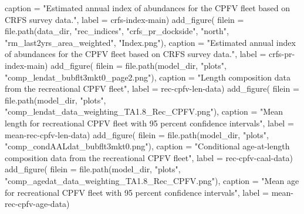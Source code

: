 \documentclass[
  letterpaper,
]{article}
\newenvironment{Shaded}{\begin{snugshade}}{\end{snugshade}}
\newcommand{\AttributeTok}[1]{\textcolor[rgb]{0.77,0.63,0.00}{#1}}
\newcommand{\FunctionTok}[1]{\textcolor[rgb]{0.00,0.00,0.00}{#1}}
\newcommand{\NormalTok}[1]{#1}
\newcommand{\StringTok}[1]{\textcolor[rgb]{0.31,0.60,0.02}{#1}}
\begin{document}
\begin{Shaded}
\begin{Highlighting}[]
\AttributeTok{caption =} \StringTok{"Estimated annual index of abundances for the CPFV fleet based on CRFS survey data."}\NormalTok{,}
\AttributeTok{label =} \StringTok{\textquotesingle{}crfs{-}index{-}main\textquotesingle{}}\NormalTok{)}
\FunctionTok{add\_figure}\NormalTok{(}
\AttributeTok{filein =} \FunctionTok{file.path}\NormalTok{(data\_dir, }\StringTok{"rec\_indices"}\NormalTok{, }\StringTok{"crfs\_pr\_dockside"}\NormalTok{, }\StringTok{"north"}\NormalTok{,  }\StringTok{"rm\_last2yrs\_area\_weighted"}\NormalTok{, }\StringTok{"Index.png"}\NormalTok{), }
\AttributeTok{caption =} \StringTok{"Estimated annual index of abundances for the CPFV fleet based on CRFS survey data."}\NormalTok{,}
\AttributeTok{label =} \StringTok{\textquotesingle{}crfs{-}pr{-}index{-}main\textquotesingle{}}\NormalTok{)}
\FunctionTok{add\_figure}\NormalTok{(}
\AttributeTok{filein =} \FunctionTok{file.path}\NormalTok{(model\_dir, }\StringTok{"plots"}\NormalTok{, }\StringTok{"comp\_lendat\_bubflt3mkt0\_page2.png"}\NormalTok{), }
\AttributeTok{caption =} \StringTok{"Length composition data from the recreational CPFV fleet"}\NormalTok{,}
\AttributeTok{label =} \StringTok{\textquotesingle{}rec{-}cpfv{-}len{-}data\textquotesingle{}}\NormalTok{)}
\FunctionTok{add\_figure}\NormalTok{(}
\AttributeTok{filein =} \FunctionTok{file.path}\NormalTok{(model\_dir, }\StringTok{"plots"}\NormalTok{, }\StringTok{"comp\_lendat\_data\_weighting\_TA1.8\_Rec\_CPFV.png"}\NormalTok{), }
\AttributeTok{caption =} \StringTok{"Mean length for recreational CPFV fleet with 95 percent confidence intervals"}\NormalTok{,}
\AttributeTok{label =} \StringTok{\textquotesingle{}mean{-}rec{-}cpfv{-}len{-}data\textquotesingle{}}\NormalTok{)}
\FunctionTok{add\_figure}\NormalTok{(}
\AttributeTok{filein =} \FunctionTok{file.path}\NormalTok{(model\_dir, }\StringTok{"plots"}\NormalTok{, }\StringTok{"comp\_condAALdat\_bubflt3mkt0.png"}\NormalTok{), }
\AttributeTok{caption =} \StringTok{"Conditional age{-}at{-}length composition data from the recreational CPFV fleet"}\NormalTok{,}
\AttributeTok{label =} \StringTok{\textquotesingle{}rec{-}cpfv{-}caal{-}data\textquotesingle{}}\NormalTok{)}
\FunctionTok{add\_figure}\NormalTok{(}
\AttributeTok{filein =} \FunctionTok{file.path}\NormalTok{(model\_dir, }\StringTok{"plots"}\NormalTok{, }\StringTok{"comp\_agedat\_data\_weighting\_TA1.8\_Rec\_CPFV.png"}\NormalTok{), }
\AttributeTok{caption =} \StringTok{"Mean age for recreational CPFV fleet with 95 percent confidence intervals"}\NormalTok{,}
\AttributeTok{label =} \StringTok{\textquotesingle{}mean{-}rec{-}cpfv{-}age{-}data\textquotesingle{}}\NormalTok{)}

\end{Highlighting}
\end{Shaded}
\end{document}
